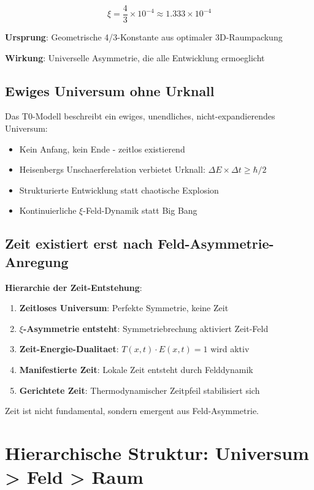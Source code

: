 \documentclass[12pt,a4paper]{article}
\newcommand{\xipar}{\xi}
\theoremstyle{definition}
\theoremstyle{remark}
\begin{document}
	\begin{equation}
		\xipar = \frac{4}{3} \times 10^{-4} \approx 1.333 \times 10^{-4}
	\end{equation}
	
	\textbf{Ursprung}: Geometrische 4/3-Konstante aus optimaler 3D-Raumpackung
	
	\textbf{Wirkung}: Universelle Asymmetrie, die alle Entwicklung ermoeglicht
	
	\subsection{Ewiges Universum ohne Urknall}
	
	Das T0-Modell beschreibt ein ewiges, unendliches, nicht-expandierendes Universum:
	
	\begin{itemize}
		\item Kein Anfang, kein Ende - zeitlos existierend
		\item Heisenbergs Unschaerferelation verbietet Urknall: $\Delta E \times \Delta t \geq \hbar/2$
		\item Strukturierte Entwicklung statt chaotische Explosion
		\item Kontinuierliche $\xipar$-Feld-Dynamik statt Big Bang
	\end{itemize}
	
	\subsection{Zeit existiert erst nach Feld-Asymmetrie-Anregung}
	
	\textbf{Hierarchie der Zeit-Entstehung}:
	\begin{enumerate}
		\item \textbf{Zeitloses Universum}: Perfekte Symmetrie, keine Zeit
		\item \textbf{$\xipar$-Asymmetrie entsteht}: Symmetriebrechung aktiviert Zeit-Feld
		\item \textbf{Zeit-Energie-Dualitaet}: $T(x,t) \cdot E(x,t) = 1$ wird aktiv
		\item \textbf{Manifestierte Zeit}: Lokale Zeit entsteht durch Felddynamik
		\item \textbf{Gerichtete Zeit}: Thermodynamischer Zeitpfeil stabilisiert sich
	\end{enumerate}
	
	Zeit ist nicht fundamental, sondern emergent aus Feld-Asymmetrie.
	
	\section{Hierarchische Struktur: Universum > Feld > Raum}
	
\end{document}
